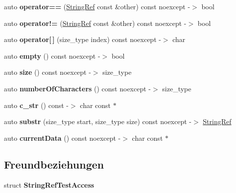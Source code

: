 \begin{DoxyCompactItemize}
auto {\bfseries operator==} (\hyperlink{classCatch_1_1StringRef}{String\+Ref} const \&other) const noexcept -\/$>$ bool
\item 
\mbox{\label{classCatch_1_1StringRef_aaa6c8bf61c4628034c19763d1c8ad215}} 
auto {\bfseries operator!=} (\hyperlink{classCatch_1_1StringRef}{String\+Ref} const \&other) const noexcept -\/$>$ bool
\item 
\mbox{\label{classCatch_1_1StringRef_a4ba2e01eec1f0f56c257d213c796ab3b}} 
auto {\bfseries operator\mbox{[}$\,$\mbox{]}} (size\+\_\+type index) const noexcept -\/$>$ char
\item 
\mbox{\label{classCatch_1_1StringRef_ac6b68b9dc1e1dec69e884e3f7be581bd}} 
auto {\bfseries empty} () const noexcept -\/$>$ bool
\item 
\mbox{\label{classCatch_1_1StringRef_ae084d72cb2952cee61a63ef36611d0ad}} 
auto {\bfseries size} () const noexcept -\/$>$ size\+\_\+type
\item 
\mbox{\label{classCatch_1_1StringRef_a6a6cac7430e626ffdd7550a081e8168f}} 
auto {\bfseries number\+Of\+Characters} () const noexcept -\/$>$ size\+\_\+type
\item 
\mbox{\label{classCatch_1_1StringRef_a1669cb2765e820ca258159676cbd82a5}} 
auto {\bfseries c\+\_\+str} () const -\/$>$ char const $\ast$
\item 
\mbox{\label{classCatch_1_1StringRef_a248568b467cf6599320903ae613c8eee}} 
auto {\bfseries substr} (size\+\_\+type start, size\+\_\+type size) const noexcept -\/$>$ \hyperlink{classCatch_1_1StringRef}{String\+Ref}
\item 
\mbox{\label{classCatch_1_1StringRef_aee240387305ca8b249169d79f36e7002}} 
auto {\bfseries current\+Data} () const noexcept -\/$>$ char const $\ast$
\end{DoxyCompactItemize}
\subsection*{Freundbeziehungen}
\begin{DoxyCompactItemize}
\item 
\mbox{\label{classCatch_1_1StringRef_a420e64e1652de1b0d427775781b018f5}} 
struct {\bfseries String\+Ref\+Test\+Access}
\end{DoxyCompactItemize}


